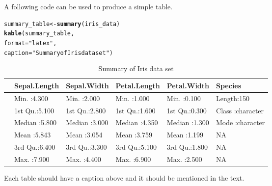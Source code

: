 \documentclass[12pt, a4paper]{article}\usepackage[]{graphicx}\usepackage[]{xcolor}
\makeatletter
\newcommand{\hlsng}[1]{\textcolor[rgb]{0.192,0.494,0.8}{#1}}%
\newcommand{\hldef}[1]{\textcolor[rgb]{0.345,0.345,0.345}{#1}}%
\newcommand{\hlkwb}[1]{\textcolor[rgb]{0.69,0.353,0.396}{#1}}%
\newcommand{\hlkwc}[1]{\textcolor[rgb]{0.333,0.667,0.333}{#1}}%
\newcommand{\hlkwd}[1]{\textcolor[rgb]{0.737,0.353,0.396}{\textbf{#1}}}%
\newenvironment{kframe}{%
 \def\at@end@of@kframe{}%
 \ifinner\ifhmode%
  \def\at@end@of@kframe{\end{minipage}}%
  \begin{minipage}{\columnwidth}%
 \fi\fi%
 \def\FrameCommand##1{\hskip\@totalleftmargin \hskip-\fboxsep
 \colorbox{shadecolor}{##1}\hskip-\fboxsep
     \hskip-\linewidth \hskip-\@totalleftmargin \hskip\columnwidth}%
 \MakeFramed {\advance\hsize-\width
   \@totalleftmargin\z@ \linewidth\hsize
   \@setminipage}}%
 {\par\unskip\endMakeFramed%
 \at@end@of@kframe}
\makeatother
\begin{document}
A following code can be used to produce a simple table.
\begin{kframe}
\begin{alltt}
\hldef{summary_table} \hlkwb{<-} \hlkwd{summary}\hldef{(iris_data)}
\hlkwd{kable}\hldef{(summary_table,}
      \hlkwc{format} \hldef{=} \hlsng{"latex"}\hldef{,}
      \hlkwc{caption} \hldef{=} \hlsng{"Summary of Iris data set"}\hldef{)}
\end{alltt}
\end{kframe}\begin{table}

\caption{\label{tab:SummaryTable}Summary of Iris data set}
\centering
\begin{tabular}[t]{l|l|l|l|l|l}
\hline
  &  Sepal.Length &  Sepal.Width &  Petal.Length &  Petal.Width &   Species\\
\hline
 & Min.   :4.300 & Min.   :2.000 & Min.   :1.000 & Min.   :0.100 & Length:150\\
\hline
 & 1st Qu.:5.100 & 1st Qu.:2.800 & 1st Qu.:1.600 & 1st Qu.:0.300 & Class :character\\
\hline
 & Median :5.800 & Median :3.000 & Median :4.350 & Median :1.300 & Mode  :character\\
\hline
 & Mean   :5.843 & Mean   :3.054 & Mean   :3.759 & Mean   :1.199 & NA\\
\hline
 & 3rd Qu.:6.400 & 3rd Qu.:3.300 & 3rd Qu.:5.100 & 3rd Qu.:1.800 & NA\\
\hline
 & Max.   :7.900 & Max.   :4.400 & Max.   :6.900 & Max.   :2.500 & NA\\
\hline
\end{tabular}
\end{table}


Each table should have a caption above and it should be mentioned in the text.
\end{document}
